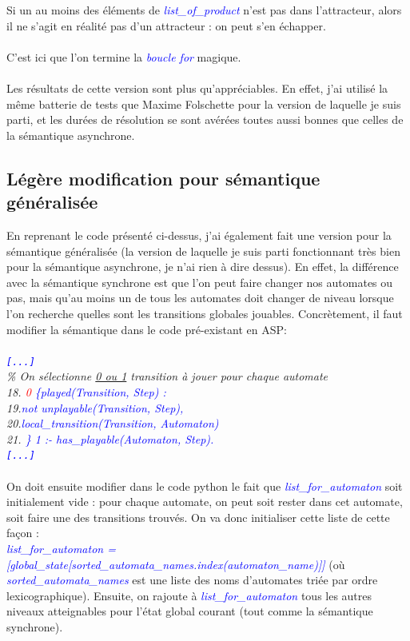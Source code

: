 \documentclass[12pt,a4paper]{article}
\begin{document}
Si un au moins des éléments de \emph{\textcolor{blue}{list\_of\_product}} n'est pas dans l'attracteur, alors il ne s'agit en réalité pas d'un attracteur : on peut s'en échapper.\\ \\
C'est ici que l'on termine la \emph{\textcolor{blue}{boucle for}} magique.\\ \\
Les résultats de cette version sont plus qu'appréciables. En effet, j'ai utilisé la même batterie de tests que Maxime Folschette pour la version de laquelle je suis parti, et les durées de résolution se sont avérées toutes aussi 
bonnes que celles de la sémantique asynchrone.

\subsection{Légère modification pour sémantique généralisée}
En reprenant le code présenté ci-dessus, j'ai également fait une version pour la sémantique généralisée (la version de laquelle je suis parti fonctionnant très bien pour la sémantique asynchrone, je n'ai rien à dire 
dessus). En effet, la différence avec la sémantique synchrone est que l'on peut faire changer nos automates ou pas, mais qu'au moins un de tous les automates doit changer de niveau lorsque l'on recherche quelles sont les 
transitions globales jouables.
Concrètement, il faut modifier la sémantique dans le code pré-existant en ASP:\\ \\
\emph{
	\textcolor{blue}{\verb![...]!}\\
	\% On sélectionne \underline{0 ou 1} transition à jouer pour chaque automate\\
	18. \textcolor{blue}{\textcolor{red}{0} \{played(Transition, Step) :}\\
	19.\qquad\qquad\textcolor{blue}{not unplayable(Transition, Step),}\\
	20.\qquad\qquad\textcolor{blue}{local\_transition(Transition, Automaton)}\\
	21. \textcolor{blue}{\} 1 :- has\_playable(Automaton, Step).}\\
	\textcolor{blue}{\verb![...]!}\\ \\
}
On doit ensuite modifier dans le code python le fait que \emph{\textcolor{blue}{list\_for\_automaton}} soit initialement vide : pour chaque automate, on peut soit rester dans cet automate, soit faire une des transitions trouvés. 
On va donc initialiser cette liste de cette façon :\\
\emph{\textcolor{blue}{list\_for\_automaton = [global\_state[sorted\_automata\_names.index(automaton\_name)]]}} (où \\
\emph{\textcolor{blue}{sorted\_automata\_names}} est une liste des noms d'automates triée par ordre lexicographique). Ensuite, on rajoute à \emph{\textcolor{blue}{list\_for\_automaton}} tous les autres niveaux atteignables pour 
l'état global courant (tout comme la sémantique synchrone).
\end{document}
